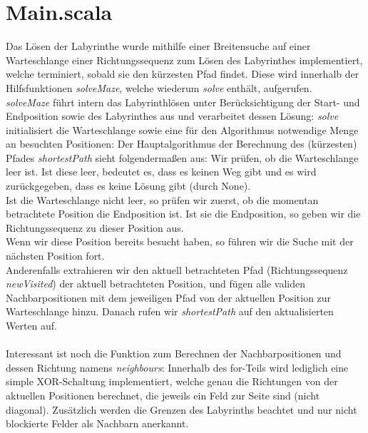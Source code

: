 \documentclass{rp}
\begin{document}
\section*{Main.scala}
Das Lösen der Labyrinthe wurde mithilfe einer Breitensuche auf einer Warteschlange einer Richtungssequenz zum Lösen des Labyrinthes implementiert, welche terminiert, sobald sie den kürzesten Pfad findet. Diese wird innerhalb der Hilfsfunktionen \textit{solveMaze}, welche wiederum \textit{solve} enthält, aufgerufen.\\
\textit{solveMaze} führt intern das Labyrinthlösen unter Berücksichtigung der Start- und Endposition sowie des Labyrinthes aus und verarbeitet dessen Lösung:
\textit{solve} initialisiert die Warteschlange sowie eine für den Algorithmus notwendige Menge an besuchten Positionen:
Der Hauptalgorithmus der Berechnung des (kürzesten) Pfades \textit{shortestPath} sieht folgendermaßen aus:
Wir prüfen, ob die Warteschlange leer ist. Ist diese leer, bedeutet es, dass es keinen Weg gibt und es wird zurückgegeben, dass es keine Lösung gibt (durch None).\\
Ist die Warteschlange nicht leer, so prüfen wir zuerst, ob die momentan betrachtete Position die Endposition ist. Ist sie die Endposition, so geben wir die Richtungssequenz zu dieser Position aus.\\
Wenn wir diese Position bereits besucht haben, so führen wir die Suche mit der nächsten Position fort.\\
Anderenfalls extrahieren wir den aktuell betrachteten Pfad (Richtungssequenz \textit{newVisited}) der aktuell betrachteten Position, und fügen alle validen Nachbarpositionen mit dem jeweiligen Pfad von der aktuellen Position zur Warteschlange hinzu. Danach rufen wir \textit{shortestPath} auf den aktualisierten Werten auf.\\\\
Interessant ist noch die Funktion zum Berechnen der Nachbarpositionen und dessen Richtung namens \textit{neighbours}:
Innerhalb des for-Teils wird lediglich eine simple XOR-Schaltung implementiert, welche genau die Richtungen von der aktuellen Positionen berechnet, die jeweils ein Feld zur Seite sind (nicht diagonal). Zusätzlich werden die Grenzen des Labyrinths beachtet und nur nicht blockierte Felder als Nachbarn anerkannt.\\
\end{document}
